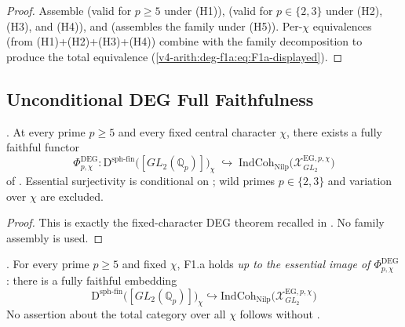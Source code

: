 \begin{proof}
Assemble  (valid
for \(p\geq 5\) under (H1)),
 (valid for \(p\in\{2,3\}\)
under (H2), (H3), and (H4)), and
(assembles the family under (H5)).
Per-\(\chi\) equivalences (from (H1)+(H2)+(H3)+(H4)) combine with the
family decomposition to produce the total equivalence
(\ref{v4-arith:deg-f1a:eq:F1a-displayed}).
\end{proof}

\subsection{Unconditional DEG Full Faithfulness}

\begin{theorem}
\label{v4-arith:deg-f1a:thm:DEG-family-ff}
\ClaimStatusProvedElsewhere. At every prime \(p\geq 5\) and every
fixed central character \(\chi\), there exists a
fully faithful functor
\begin{equation}
\Phi^{\mathrm{DEG}}_{p,\chi}\colon
\mathrm{D}^{\mathrm{sph\text{-}fin}}\bigl([GL_{2}(\mathbb{Q}_{p})]\bigr)_{\chi}
\;\hookrightarrow\;
\mathrm{IndCoh}_{\mathrm{Nilp}}\bigl(\mathcal{X}^{\mathrm{EG},p,\chi}_{GL_{2}}\bigr)
\end{equation}
of . Essential surjectivity is
conditional on ;
wild primes \(p\in\{2,3\}\) and variation over \(\chi\) are excluded.
\end{theorem}

\begin{proof}
This is exactly the fixed-character DEG theorem recalled in
.  No family assembly is
used.
\end{proof}

\begin{corollary}
\label{v4-arith:deg-f1a:cor:partial-F1a-large-p}
\ClaimStatusProvedElsewhere. For every prime \(p\geq 5\) and fixed
\(\chi\), F1.a holds
\emph{up to the essential image of \(\Phi^{\mathrm{DEG}}_{p,\chi}\)}: there
is a fully faithful embedding
\[
\mathrm{D}^{\mathrm{sph\text{-}fin}}\bigl([GL_{2}(\mathbb{Q}_{p})]\bigr)_{\chi}\hookrightarrow\mathrm{IndCoh}_{\mathrm{Nilp}}\bigl(\mathcal{X}^{\mathrm{EG},p,\chi}_{GL_{2}}\bigr)
\]
No assertion about the total category over all \(\chi\) follows
without .
\end{corollary}

